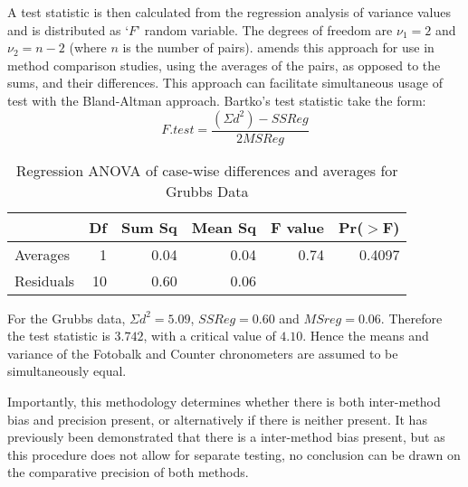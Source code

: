 \documentclass[Main.tex]{subfiles}
\begin{document}
	A test statistic is then calculated from the regression analysis
	of variance values \citep{BB89} and is distributed as `$F$' random
	variable. The degrees of freedom are $\nu_{1}=2$ and $\nu_{2}=n-2$
	(where $n$ is the number of pairs). 
	\citet{Bartko} amends this approach for use in method
	comparison studies, using the averages of the pairs, as opposed to
	the sums, and their differences. This approach can facilitate
	simultaneous usage of test with the Bland-Altman approach.
	Bartko's test statistic take the form:
	\[ F.test = \frac{(\Sigma d^{2})-SSReg}{2MSReg}
	\]
	\begin{table}[ht]
		\begin{center}
			\begin{tabular}{lrrrrr}
				\hline
				& Df & Sum Sq & Mean Sq & F value & Pr($>$F) \\
				\hline
				Averages & 1 & 0.04 & 0.04 & 0.74 & 0.4097 \\
				Residuals & 10 & 0.60 & 0.06 &  &  \\
				\hline
			\end{tabular}
			\caption{Regression ANOVA of case-wise differences and averages
				for Grubbs Data}
		\end{center}
	\end{table}
	
	For the Grubbs data, $\Sigma d^{2}=5.09 $, $SSReg = 0.60$ and $MSreg=0.06$. Therefore the test statistic is $3.742$, with a critical value of $4.10$. Hence the means and variance of the
	Fotobalk and Counter chronometers are assumed to be simultaneously equal.
	
	Importantly, this methodology determines whether there is both inter-method bias and precision present, or alternatively if there
	is neither present. It has previously been demonstrated that there is a inter-method bias present, but as this procedure does not allow for separate testing, no conclusion can be drawn on the comparative precision of both methods.
	
	
	
	
\end{document}
